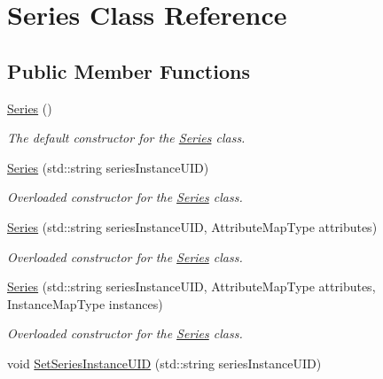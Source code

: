 \hypertarget{class_series}{
\section{Series Class Reference}
\label{class_series}
}
\subsection*{Public Member Functions}
\begin{DoxyCompactItemize}
\item 
\hypertarget{class_series_ab0cc5b39ed4d0f70fd17121c52d758e3}{
\hyperlink{class_series_ab0cc5b39ed4d0f70fd17121c52d758e3}{Series} ()}
\label{class_series_ab0cc5b39ed4d0f70fd17121c52d758e3}

\begin{DoxyCompactList}\small\item\em The default constructor for the \hyperlink{class_series}{Series} class. \item\end{DoxyCompactList}\item 
\hyperlink{class_series_a6421860eef145b416c096c9fa6d67d43}{Series} (std::string seriesInstanceUID)
\begin{DoxyCompactList}\small\item\em Overloaded constructor for the \hyperlink{class_series}{Series} class. \item\end{DoxyCompactList}\item 
\hyperlink{class_series_a6f188baef7b4ff3a6ed52162f2129775}{Series} (std::string seriesInstanceUID, AttributeMapType attributes)
\begin{DoxyCompactList}\small\item\em Overloaded constructor for the \hyperlink{class_series}{Series} class. \item\end{DoxyCompactList}\item 
\hyperlink{class_series_a6756c4f6bb8664980a437ae73fd18909}{Series} (std::string seriesInstanceUID, AttributeMapType attributes, InstanceMapType instances)
\begin{DoxyCompactList}\small\item\em Overloaded constructor for the \hyperlink{class_series}{Series} class. \item\end{DoxyCompactList}\item 
void \hyperlink{class_series_a659b1383b35d3948f936605627bb7ffb}{SetSeriesInstanceUID} (std::string seriesInstanceUID)

\end{DoxyCompactItemize}
